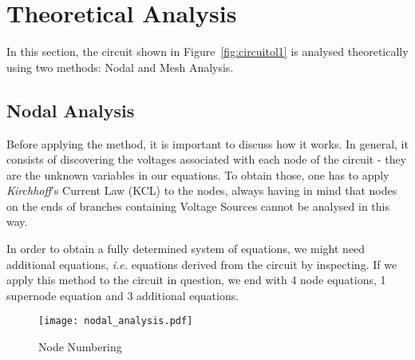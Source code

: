 \section{Theoretical Analysis}
\label{sec:analysis}

In this section, the circuit shown in Figure~\ref{fig:circuitol1} is analysed
theoretically using two methods: Nodal and Mesh Analysis.

\subsection{Nodal Analysis} 
\label{subsec:node_analysis} 

Before applying the method, it is important to discuss how it works. In general, it consists of discovering the voltages associated with each node of the circuit - they are the unknown variables in our equations. To obtain those, one has to apply \textit{Kirchhoff}'s Current Law (KCL) to the nodes, always having in mind that nodes on the ends of branches containing  Voltage Sources cannot be analysed in this way.

In order to obtain a fully determined system of equations, we might need additional equations, \textit{i.e.} equations derived from the circuit by inspecting. If we apply this method to the circuit in question, we end with 4 node equations, 1 supernode equation and 3 additional equations. 

\begin{figure}[h] \centering
\texttt{[image: nodal\_analysis.pdf]}
\caption{Node Numbering}
\label{fig:node_numbering}
\end{figure}

